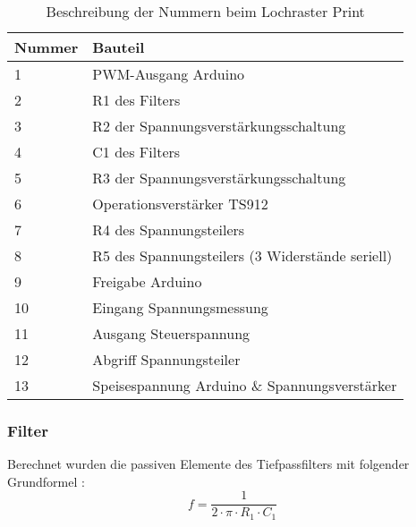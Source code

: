 \begin{table}[ht!]
	\centering
	\begin{tabular}{|l|l|}
		\hline
		Nummer & Bauteil                                                             \\ \hline
		1      & PWM-Ausgang Arduino                                                 \\ \hline
		2      & R1 des Filters                                                      \\ \hline
		3      & R2 der Spannungsverstärkungsschaltung                               \\ \hline
		4      & C1 des Filters                                                      \\ \hline
		5      & R3 der Spannungsverstärkungsschaltung                               \\ \hline
		6      & Operationsverstärker TS912                                          \\ \hline
		7      & R4 des Spannungsteilers 											 \\ \hline
		8      & R5 des Spannungsteilers (3 Widerstände seriell)                     \\ \hline
		9      & Freigabe Arduino                                                    \\ \hline
		10     & Eingang Spannungsmessung                                            \\ \hline
		11     & Ausgang Steuerspannung                                              \\ \hline
		12     & Abgriff Spannungsteiler                                             \\ \hline
		13     & Speisespannung Arduino \& Spannungsverstärker                       \\ \hline
	\end{tabular}
	\caption{Beschreibung der Nummern beim Lochraster Print}
	\label{tab:Laboraufbau}
\end{table}

\newpage
\subsubsection*{Filter}
Berechnet wurden die passiven Elemente des Tiefpassfilters mit folgender Grundformel \cite{Tiefpass}:
\begin{equation}
f = \frac{1}{2 \cdot \pi \cdot R_1 \cdot C_1}
\end{equation}



